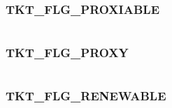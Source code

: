 \documentclass[letterpaper,10pt,english]{sphinxmanual}
\begin{document}
\subsubsection{TKT\_FLG\_PROXIABLE}
\label{appdev/refs/macros/TKT_FLG_PROXIABLE:tkt-flg-proxiable}\label{appdev/refs/macros/TKT_FLG_PROXIABLE:tkt-flg-proxiable-data}\label{appdev/refs/macros/TKT_FLG_PROXIABLE::doc}

\begin{fulllineitems}
\label{appdev/refs/macros/TKT_FLG_PROXIABLE:TKT_FLG_PROXIABLE}
\end{fulllineitems}


\begin{tabulary}{\linewidth}{|L|L|}
\hline

 & 
\\
\hline\end{tabulary}



\subsubsection{TKT\_FLG\_PROXY}
\label{appdev/refs/macros/TKT_FLG_PROXY::doc}\label{appdev/refs/macros/TKT_FLG_PROXY:tkt-flg-proxy}\label{appdev/refs/macros/TKT_FLG_PROXY:tkt-flg-proxy-data}

\begin{fulllineitems}
\label{appdev/refs/macros/TKT_FLG_PROXY:TKT_FLG_PROXY}
\end{fulllineitems}


\begin{tabulary}{\linewidth}{|L|L|}
\hline

 & 
\\
\hline\end{tabulary}



\subsubsection{TKT\_FLG\_RENEWABLE}
\label{appdev/refs/macros/TKT_FLG_RENEWABLE::doc}\label{appdev/refs/macros/TKT_FLG_RENEWABLE:tkt-flg-renewable}\label{appdev/refs/macros/TKT_FLG_RENEWABLE:tkt-flg-renewable-data}
\end{document}
